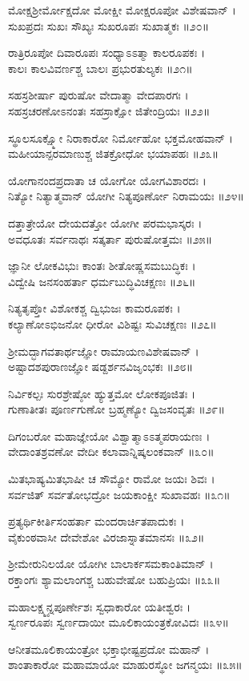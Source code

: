 ಮೋಕ್ಷಶ್ರೀರ್ಮೋಕ್ಷದೋ ಮೋಕ್ಷೀ ಮೋಕ್ಷರೂಪೋ ವಿಶೇಷವಾನ್ ।\\
ಸುಖಪ್ರದಃ ಸುಖಃ ಸೌಖ್ಯಃ ಸುಖರೂಪಃ ಸುಖಾತ್ಮಕಃ ॥೨೦॥

ರಾತ್ರಿರೂಪೋ ದಿವಾರೂಪಃ ಸಂಧ್ಯಾಽಽತ್ಮಾ ಕಾಲರೂಪಕಃ ।\\
ಕಾಲಃ ಕಾಲವಿವರ್ಣಶ್ಚ ಬಾಲಃ ಪ್ರಭುರತುಲ್ಯಕಃ ॥೨೧॥

ಸಹಸ್ರಶೀರ್ಷಾ ಪುರುಷೋ ವೇದಾತ್ಮಾ ವೇದಪಾರಗಃ ।\\
ಸಹಸ್ರಚರಣೋಽನಂತಃ ಸಹಸ್ರಾಕ್ಷೋ ಜಿತೇಂದ್ರಿಯಃ ॥೨೨॥

ಸ್ಥೂಲಸೂಕ್ಷ್ಮೋ ನಿರಾಕಾರೋ ನಿರ್ಮೋಹೋ ಭಕ್ತಮೋಹವಾನ್ ।\\
ಮಹೀಯಾನ್ಪರಮಾಣುಶ್ಚ ಜಿತಕ್ರೋಧೋ ಭಯಾಪಹಃ ॥೨೩॥

ಯೋಗಾನಂದಪ್ರದಾತಾ ಚ ಯೋಗೋ ಯೋಗವಿಶಾರದಃ ।\\
ನಿತ್ಯೋ ನಿತ್ಯಾತ್ಮವಾನ್ ಯೋಗೀ ನಿತ್ಯಪೂರ್ಣೋ ನಿರಾಮಯಃ ॥೨೪॥

ದತ್ತಾತ್ರೇಯೋ ದೇಯದತ್ತೋ ಯೋಗೀ ಪರಮಭಾಸ್ಕರಃ ।\\
ಅವಧೂತಃ ಸರ್ವನಾಥಃ ಸತ್ಕರ್ತಾ ಪುರುಷೋತ್ತಮಃ ॥೨೫॥

ಜ್ಞಾನೀ ಲೋಕವಿಭುಃ ಕಾಂತಃ ಶೀತೋಷ್ಣಸಮಬುದ್ಧಿಕಃ ।\\
ವಿದ್ವೇಷಿ ಜನಸಂಹರ್ತಾ ಧರ್ಮಬುದ್ಧಿವಿಚಕ್ಷಣಃ ॥೨೬॥

ನಿತ್ಯತೃಪ್ತೋ ವಿಶೋಕಶ್ಚ ದ್ವಿಭುಜಃ ಕಾಮರೂಪಕಃ ।\\
ಕಲ್ಯಾಣೋಽಭಿಜನೋ ಧೀರೋ ವಿಶಿಷ್ಟಃ ಸುವಿಚಕ್ಷಣಃ ॥೨೭॥

ಶ್ರೀಮದ್ಭಾಗವತಾರ್ಥಜ್ಞೋ ರಾಮಾಯಣವಿಶೇಷವಾನ್ ।\\
ಅಷ್ಟಾದಶಪುರಾಣಜ್ಞೋ ಷಡ್ದರ್ಶನವಿಜೃಂಭಕಃ ॥೨೮॥

ನಿರ್ವಿಕಲ್ಪಃ ಸುರಶ್ರೇಷ್ಠೋ ಹ್ಯುತ್ತಮೋ ಲೋಕಪೂಜಿತಃ ।\\
ಗುಣಾತೀತಃ ಪೂರ್ಣಗುಣೋ ಬ್ರಹ್ಮಣ್ಯೋ ದ್ವಿಜಸಂವೃತಃ ॥೨೯॥

ದಿಗಂಬರೋ ಮಹಾಜ್ಞೇಯೋ ವಿಶ್ವಾತ್ಮಾಽಽತ್ಮಪರಾಯಣಃ ।\\
ವೇದಾಂತಶ್ರವಣೋ ವೇದೀ ಕಲಾವಾನ್ನಿಷ್ಕಲಂಕವಾನ್ ॥೩೦॥

ಮಿತಭಾಷ್ಯಮಿತಭಾಷೀ ಚ ಸೌಮ್ಯೋ ರಾಮೋ ಜಯಃ ಶಿವಃ ।\\
ಸರ್ವಜಿತ್ ಸರ್ವತೋಭದ್ರೋ ಜಯಕಾಂಕ್ಷೀ ಸುಖಾವಹಃ ॥೩೧॥

ಪ್ರತ್ಯರ್ಥಿಕೀರ್ತಿಸಂಹರ್ತಾ ಮಂದರಾರ್ಚಿತಪಾದುಕಃ ।\\
ವೈಕುಂಠವಾಸೀ ದೇವೇಶೋ ವಿರಜಾಸ್ನಾತಮಾನಸಃ ॥೩೨॥

ಶ್ರೀಮೇರುನಿಲಯೋ ಯೋಗೀ ಬಾಲಾರ್ಕಸಮಕಾಂತಿಮಾನ್ ।\\
ರಕ್ತಾಂಗಃ ಶ್ಯಾಮಲಾಂಗಶ್ಚ ಬಹುವೇಷೋ ಬಹುಪ್ರಿಯಃ ॥೩೩॥

ಮಹಾಲಕ್ಷ್ಮ್ಯನ್ನಪೂರ್ಣೇಶಃ ಸ್ವಧಾಕಾರೋ ಯತೀಶ್ವರಃ ।\\
ಸ್ವರ್ಣರೂಪಃ ಸ್ವರ್ಣದಾಯೀ ಮೂಲಿಕಾಯಂತ್ರಕೋವಿದಃ ॥೩೪॥

ಆನೀತಮೂಲಿಕಾಯಂತ್ರೋ ಭಕ್ತಾಭೀಷ್ಟಪ್ರದೋ ಮಹಾನ್ ।\\
ಶಾಂತಾಕಾರೋ ಮಹಾಮಾಯೋ ಮಾಹುರಸ್ಥೋ ಜಗನ್ಮಯಃ ॥೩೫॥

